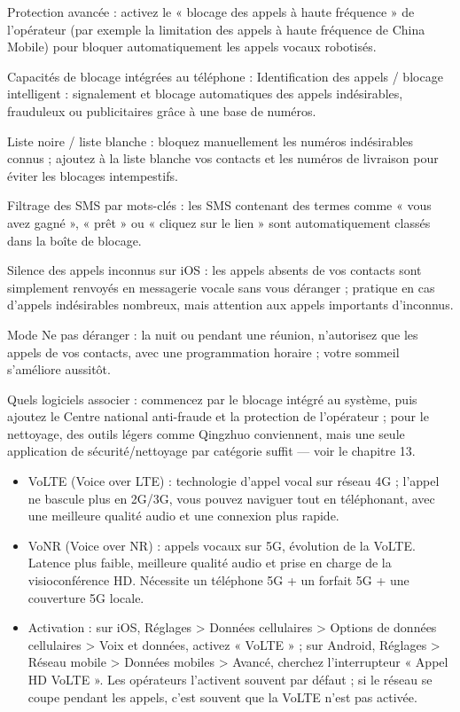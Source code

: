 Protection avancée : activez le « blocage des appels à haute fréquence » de l'opérateur (par exemple la limitation des appels à haute fréquence de China Mobile) pour bloquer automatiquement les appels vocaux robotisés.

Capacités de blocage intégrées au téléphone : Identification des appels / blocage intelligent : signalement et blocage automatiques des appels indésirables, frauduleux ou publicitaires grâce à une base de numéros.

Liste noire / liste blanche : bloquez manuellement les numéros indésirables connus ; ajoutez à la liste blanche vos contacts et les numéros de livraison pour éviter les blocages intempestifs.

Filtrage des SMS par mots-clés : les SMS contenant des termes comme « vous avez gagné », « prêt » ou « cliquez sur le lien » sont automatiquement classés dans la boîte de blocage.

Silence des appels inconnus sur iOS : les appels absents de vos contacts sont simplement renvoyés en messagerie vocale sans vous déranger ; pratique en cas d'appels indésirables nombreux, mais attention aux appels importants d'inconnus.

Mode Ne pas déranger : la nuit ou pendant une réunion, n'autorisez que les appels de vos contacts, avec une programmation horaire ; votre sommeil s'améliore aussitôt.

Quels logiciels associer : commencez par le blocage intégré au système, puis ajoutez le Centre national anti-fraude et la protection de l'opérateur ; pour le nettoyage, des outils légers comme Qingzhuo conviennent, mais une seule application de sécurité/nettoyage par catégorie suffit — voir le chapitre 13.


\begin{itemize}
  \item VoLTE (Voice over LTE) : technologie d'appel vocal sur réseau 4G ; l'appel ne bascule plus en 2G/3G, vous pouvez naviguer tout en téléphonant, avec une meilleure qualité audio et une connexion plus rapide.
  \item VoNR (Voice over NR) : appels vocaux sur 5G, évolution de la VoLTE. Latence plus faible, meilleure qualité audio et prise en charge de la visioconférence HD. Nécessite un téléphone 5G + un forfait 5G + une couverture 5G locale.
  \item Activation : sur iOS, Réglages > Données cellulaires > Options de données cellulaires > Voix et données, activez « VoLTE » ; sur Android, Réglages > Réseau mobile > Données mobiles > Avancé, cherchez l'interrupteur « Appel HD VoLTE ». Les opérateurs l'activent souvent par défaut ; si le réseau se coupe pendant les appels, c'est souvent que la VoLTE n'est pas activée.
\end{itemize}

